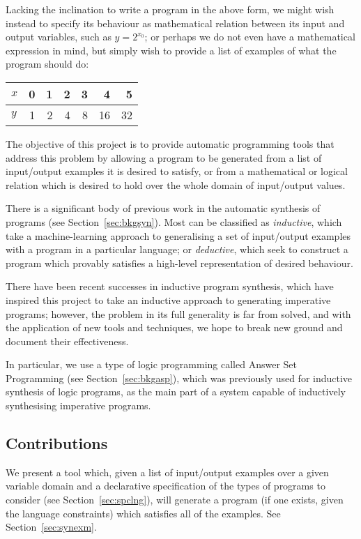 \documentclass[a4paper,twoside,notitlepage]{article}
\begin{document}
Lacking the inclination to write a program in the above form, we might 
wish instead to specify its behaviour as mathematical relation between 
its input and output variables, such as $y = 2^{x_0}$; or perhaps we do not 
even have a mathematical expression in mind, but simply wish to provide a 
list of examples of what the program should do:
\begin{center}
\begin{tabular}{| l || r | r | r | r | r | r |}
    \hline
    $x$ & 0 & 1 & 2 & 3 & 4  &  5 \\
    \hline
    $y$ & 1 & 2 & 4 & 8 & 16 & 32 \\
    \hline
\end{tabular}
\end{center}

The objective of this project is to provide automatic programming tools 
that address this problem by allowing a program to be generated from a 
list of input/output examples it is desired to satisfy, or from a 
mathematical or logical relation which is desired to hold over the whole 
domain of input/output values.
\clearpage

There is a significant body of previous work in the automatic synthesis of 
programs (see Section~\ref{sec:bkgsyn}). Most can be classified as 
\emph{inductive}, which take a machine-learning approach to generalising a set 
of input/output examples with a program in a particular language; or 
\emph{deductive}\cite{cheatham86}\cite{bundy90}\cite{colon05}, which seek to 
construct a program which provably satisfies a high-level representation of 
desired behaviour.

There have been recent successes in inductive program synthesis\cite{tds}, 
which have inspired this project to take an inductive approach to generating 
imperative programs; however, the problem in its full generality is far from 
solved, and with the application of new tools and techniques, we hope to break 
new ground and document their effectiveness.

In particular, we use a type of logic programming called Answer Set 
Programming (see Section~\ref{sec:bkgasp}), which was previously used for 
inductive synthesis of logic programs, as the main part of a system 
capable of inductively synthesising imperative programs.

\subsection{Contributions}
We present a tool which, given a list of input/output examples over a 
given variable domain and a declarative specification of the types of 
programs to consider (see Section~\ref{sec:spclng}), will generate a 
program (if one exists, given the language constraints) which satisfies 
all of the examples. See Section~\ref{sec:synexm}.
\end{document}

